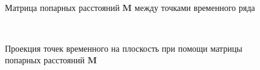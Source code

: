 \documentclass[12pt, twoside]{article}
\numberwithin{equation}{section}
\begin{document}
\begin{figure}[h!t]\center
{}
\\
\caption{Матрица попарных расстояний $\textbf{M}$ между точками временного ряда}
\label{fig_real_distance}
\end{figure}

\begin{figure}[h!t]\center
{}
\\
\caption{Проекция точек временного на плоскость при помощи матрицы попарных расстояний $\textbf{M}$}
\label{fig_real_2D}
\end{figure}
\end{document}

